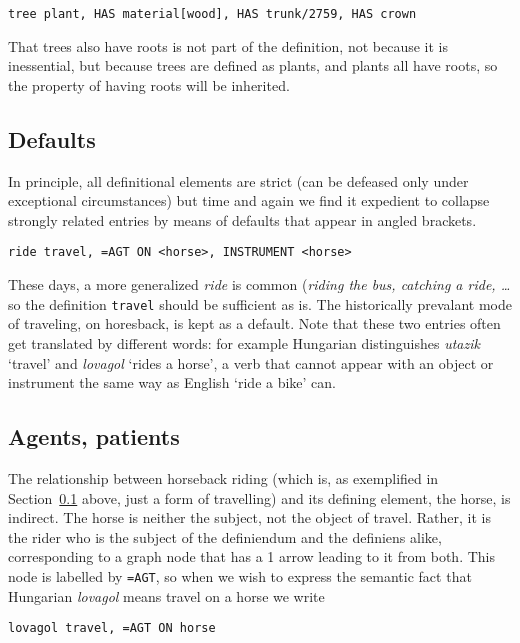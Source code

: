 \documentclass[11pt,bookmarks,bookmarksnumbered,naturalnames,plainpages=false,pdftex,colorlinks=true,urlcolor=blue,bookmarksdepth=subsection,plainpages=false]{paper}
\begin{document}
\begin{verbatim}
tree plant, HAS material[wood], HAS trunk/2759, HAS crown 
\end{verbatim}

\noindent
That trees also have roots is not part of the definition, not because it is
inessential, but because trees are defined as plants, and plants all have
roots, so the property of having roots will be inherited.

\subsection{Defaults}\label{default}

In principle, all definitional elements are strict (can be defeased only under
exceptional circumstances) but time and again we find it expedient to collapse 
strongly related entries by means of defaults that appear in angled brackets. 

\begin{verbatim}
ride travel, =AGT ON <horse>, INSTRUMENT <horse>
\end{verbatim}

\noindent
These days, a more generalized {\it ride} is common ({\it riding the bus,
  catching a ride, \ldots} so the definition {\tt travel} should be sufficient
as is. The historically prevalant mode of traveling, on horesback, is kept as
a default. Note that these two entries often get translated by different
words: for example Hungarian distinguishes {\it utazik} `travel' and {\it
  lovagol} `rides a horse', a verb that cannot appear with an object or
instrument the same way as English `ride a bike' can.  

\subsection{Agents, patients}\label{agtpat}

The relationship between horseback riding (which is, as exemplified in
Section~\ref{default} above, just a form of travelling) and its defining
element, the horse, is indirect. The horse is neither the subject, not the
object of travel.  Rather, it is the rider who is the subject of the
definiendum and the definiens alike, corresponding to a graph node that has a
1 arrow leading to it from both. This node is labelled by {\tt =AGT}, so when
we wish to express the semantic fact that Hungarian {\it lovagol} means travel
on a horse we write

\begin{verbatim}
lovagol travel, =AGT ON horse
\end{verbatim} 
\end{document}
